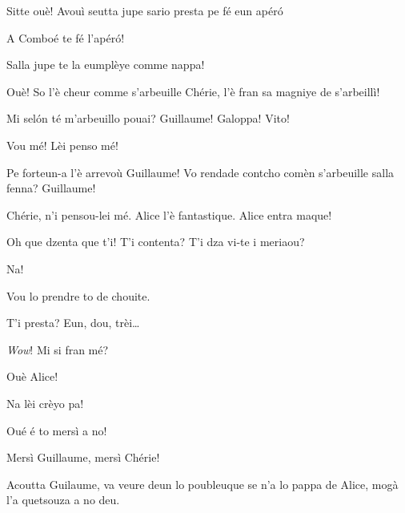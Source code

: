 \begin{drama}
{\Alicespeaks Sitte ouè! Avouì seutta jupe sario presta pe fé eun apér\'o

\Guillaumespeaks A Comboé te fé l'apér\'o!

\Cheriespeaks Salla jupe te la eumplèye comme nappa!


\Alicespeaks Ouè! So l'è cheur comme s'arbeuille Chérie, l'è fran sa magniye de s'arbeillì!

\Cheriespeaks{} Mi sel\'on té m'arbeuillo pouai? Guillaume! Galoppa! Vito!

\Guillaumespeaks Vou mé! Lèi penso mé!


}

\Cheriespeaks{} Pe forteun-a l'è arrevoù Guillaume! Vo rendade contcho comèn s'arbeuille salla fenna? Guillaume!


\Guillaumespeaks Chérie, n’i pensou-lei mé. Alice l'è fantastique. Alice entra maque!


\Cheriespeaks Oh que dzenta que t'i! T'i contenta? T'i dza vi-te i meriaou?

\Alicespeaks Na!

\Cheriespeaks Vou lo prendre to de chouite.


\Cheriespeaks{} T'i presta? Eun, dou, trèi\ldots


\Alicespeaks \textit{Wow}! Mi si fran mé?

\Guillaumespeaks Ouè Alice!

\Alicespeaks Na lèi crèyo pa!

\Cheriespeaks Oué é to mersì a no!

\Alicespeaks Mersì Guillaume, mersì Chérie!

\Cheriespeaks{} Acoutta Guilaume, va veure deun lo poubleuque se n'a lo pappa de Alice, mogà l'a quetsouza a no deu.


\end{drama}
